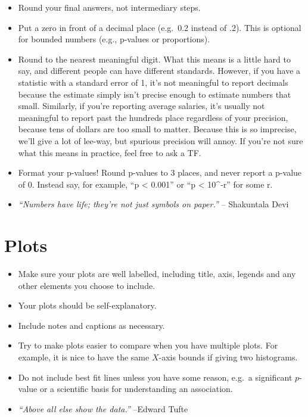\documentclass[
  letterpaper,
  DIV=11,
  numbers=noendperiod]{scrreprt}
\providecommand{\tightlist}{%
  \setlength{\itemsep}{0pt}\setlength{\parskip}{0pt}}\usepackage{longtable,booktabs,array}
\begin{document}
\begin{itemize}
\tightlist
\item
  Round your final answers, not intermediary steps.
\item
  Put a zero in front of a decimal place (e.g.~0.2 instead of .2). This
  is optional for bounded numbers (e.g., p-values or proportions).
\item
  Round to the nearest meaningful digit. What this means is a little
  hard to say, and different people can have different standards.
  However, if you have a statistic with a standard error of 1, it's not
  meaningful to report decimals because the estimate simply isn't
  precise enough to estimate numbers that small. Similarly, if you're
  reporting average salaries, it's usually not meaningful to report past
  the hundreds place regardless of your precision, because tens of
  dollars are too small to matter. Because this is so imprecise, we'll
  give a lot of lee-way, but spurious precision will annoy. If you're
  not sure what this means in practice, feel free to ask a TF.
\item
  Format your p-values! Round p-values to 3 places, and never report a
  p-value of 0. Instead say, for example, ``p \textless{} 0.001'' or ``p
  \textless{} 10\^{}-r'' for some r.
\item
  \emph{``Numbers have life; they're not just symbols on paper.''} --
  Shakuntala Devi
\end{itemize}

\section*{Plots}\label{plots}


\begin{itemize}
\tightlist
\item
  Make sure your plots are well labelled, including title, axis, legends
  and any other elements you choose to include.
\item
  Your plots should be self-explanatory.
\item
  Include notes and captions as necessary.
\item
  Try to make plots easier to compare when you have multiple plots. For
  example, it is nice to have the same \(X\)-axis bounds if giving two
  histograms.
\item
  Do not include best fit lines unless you have some reason, e.g.~a
  significant \(p\)-value or a scientific basis for understanding an
  association.
\item
  \emph{``Above all else show the data.''} --Edward Tufte
\end{itemize}
\end{document}
